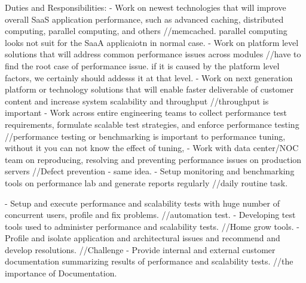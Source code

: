 Duties and Responsibilities:
- Work on newest technologies that will improve overall SaaS application performance, such as advanced caching, distributed computing, parallel computing, and others
//memcached. parallel computing looks not suit for the SaaA applicaiotn in normal case.
- Work on platform level solutions that will address common performance issues across modules
//have to find the root case of performance issue. if it is caused by the platform level factors, we certainly should addesss it at that level.
- Work on next generation platform or technology solutions that will enable faster deliverable of customer content and increase system scalability and throughput
//throughput is important
- Work across entire engineering teams to collect performance test requirements, formulate scalable test strategies, and enforce performance testing
//performance testing or benchmarking is important to performance tuning, without it you can not know the effect of tuning, 
- Work with data center/NOC team on reproducing, resolving and preventing performance issues on production servers
//Defect prevention - same idea.
- Setup monitoring and benchmarking tools on performance lab and generate reports regularly
//daily routine task.

- Setup and execute performance and scalability tests with huge number of concurrent users, profile and fix problems.
//automation test.
- Developing test tools used to administer performance and scalability tests.
//Home grow tools.
- Profile and isolate application and architectural issues and recommend and develop resolutions.
//Challenge
- Provide internal and external customer documentation summarizing results of performance and scalability tests.
//the importance of Documentation.

